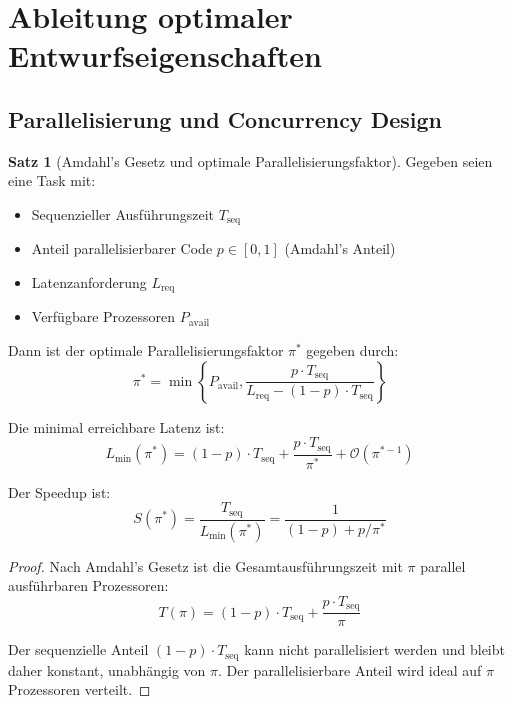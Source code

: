\documentclass[a4paper,11pt]{article}
\theoremstyle{definition}
\newtheorem{satz}{Satz}
\newenvironment{beweis}{\begin{proof}}{\end{proof}}
\begin{document}
\section{Ableitung optimaler Entwurfseigenschaften}

\subsection{Parallelisierung und Concurrency Design}

\begin{satz}[Amdahl's Gesetz und optimale Parallelisierungsfaktor]
    \label{satz:parallelism}
    Gegeben seien eine Task mit:
    \begin{itemize}
        \item Sequenzieller Ausführungszeit $T_{\text{seq}}$
        \item Anteil parallelisierbarer Code $p \in [0, 1]$ (Amdahl's Anteil)
        \item Latenzanforderung $L_{\text{req}}$
        \item Verfügbare Prozessoren $P_{\text{avail}}$
    \end{itemize}

    Dann ist der optimale Parallelisierungsfaktor $\pi^*$ gegeben durch:
    \[
        \pi^* = \min \left\{ P_{\text{avail}}, \frac{p \cdot T_{\text{seq}}}{L_{\text{req}} - (1-p) \cdot T_{\text{seq}}} \right\}
    \]

    Die minimal erreichbare Latenz ist:
    \[
        L_{\min}(\pi^*) = (1-p) \cdot T_{\text{seq}} + \frac{p \cdot T_{\text{seq}}}{\pi^*} + \mathcal{O}(\pi^{*-1})
    \]

    Der Speedup ist:
    \[
        S(\pi^*) = \frac{T_{\text{seq}}}{L_{\min}(\pi^*)} = \frac{1}{(1-p) + p/\pi^*}
    \]

    \begin{beweis}
        Nach Amdahl's Gesetz ist die Gesamtausführungszeit mit $\pi$ parallel ausführbaren 
        Prozessoren:
        \[
            T(\pi) = (1-p) \cdot T_{\text{seq}} + \frac{p \cdot T_{\text{seq}}}{\pi}
        \]

        Der sequenzielle Anteil $(1-p) \cdot T_{\text{seq}}$ kann nicht parallelisiert werden 
        und bleibt daher konstant, unabhängig von $\pi$. Der parallelisierbare Anteil 
        wird ideal auf $\pi$ Prozessoren verteilt.


\end{beweis}
\end{satz}
\end{document}
